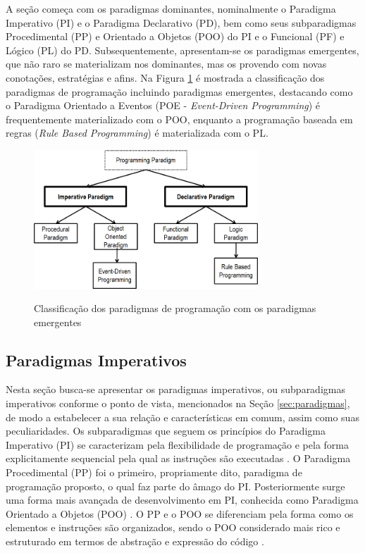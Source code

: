 A seção começa com os paradigmas dominantes, nominalmente o Paradigma Imperativo
(PI) e o Paradigma Declarativo (PD), bem como seus subparadigmas Procedimental
(PP) e Orientado a Objetos (POO) do PI e o Funcional (PF) e Lógico (PL) do PD.
Subsequentemente, apresentam-se os paradigmas emergentes, que não raro se
materializam nos dominantes, mas os provendo com novas conotações, estratégias e
afins. Na Figura \ref{fig:paradigmas_simao} é mostrada a classificação dos
paradigmas de programação incluindo paradigmas emergentes, destacando como o
Paradigma Orientado a Eventos (POE - \textit{Event-Driven Programming}) é
frequentemente materializado com o POO, enquanto a programação baseada em regras
(\textit{Rule Based Programming}) é materializada com o PL.

\begin{figure}[!htb]
  \centering
  \caption{Classificação dos paradigmas de programação com os paradigmas emergentes}
  \includegraphics[width=0.75\textwidth]{../figures/paradimas_simao.png}
  \label{fig:paradigmas_simao}
\end{figure}

\subsection{Paradigmas Imperativos}\label{sec:imperativos}

Nesta seção busca-se apresentar os paradigmas imperativos, ou subparadigmas
imperativos conforme o ponto de vista, mencionados na Seção
\ref{sec:paradigmas}, de modo a estabelecer a sua relação e características em
comum, assim como suas peculiaridades. Os subparadigmas que seguem os princípios
do Paradigma Imperativo (PI) se caracterizam pela flexibilidade de programação e
pela forma explicitamente sequencial pela qual as instruções são executadas
\cite{msc_Banaszewski_2009}. O Paradigma Procedimental (PP) foi o primeiro,
propriamente dito, paradigma de programação proposto, o qual faz parte do âmago
do PI. Posteriormente surge uma forma mais avançada de desenvolvimento em PI,
conhecida como Paradigma Orientado a Objetos (POO) \cite{msc_Banaszewski_2009}.
O PP e o POO se diferenciam pela forma como os elementos e instruções são
organizados, sendo o POO considerado mais rico e estruturado em termos de
abstração e expressão do código \cite{doc_ronszcka_2019}.

